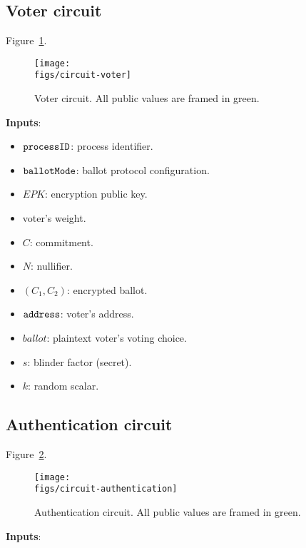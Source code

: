 
\subsection{Voter circuit}

Figure~\ref{fig:circuit-voter}.

\begin{figure}[H]
	\centerline{\texttt{[image: \\figs/circuit-voter]}}
	\caption{Voter circuit. All public values are framed in green.}
	\label{fig:circuit-voter}
\end{figure}

\textbf{Inputs}:

\begin{itemize}
	\setlength\itemsep{1em}
		\item \public $\texttt{processID}$: process identifier.
		\item \public $\texttt{ballotMode}$: ballot protocol configuration.
		\item \public $EPK$: encryption public key.
		\item \public voter's weight.
		\item \public $C$: commitment.
		\item \public $N$: nullifier.
		\item \public $(C_1, C_2)$: encrypted ballot.
%
		\item \private $\texttt{address}$: voter's address.
		\item \private $ballot$: plaintext voter's voting choice.
		\item \private $s$: blinder factor (secret).
		\item \private $k$: random scalar.
\end{itemize}


\newpage
\subsection{Authentication circuit}

Figure~\ref{fig:circuit-authentication}.

\begin{figure}[H]
	\centerline{\texttt{[image: \\figs/circuit-authentication]}}
	\caption{Authentication circuit. All public values are framed in green.}
	\label{fig:circuit-authentication}
\end{figure}

\textbf{Inputs}:

